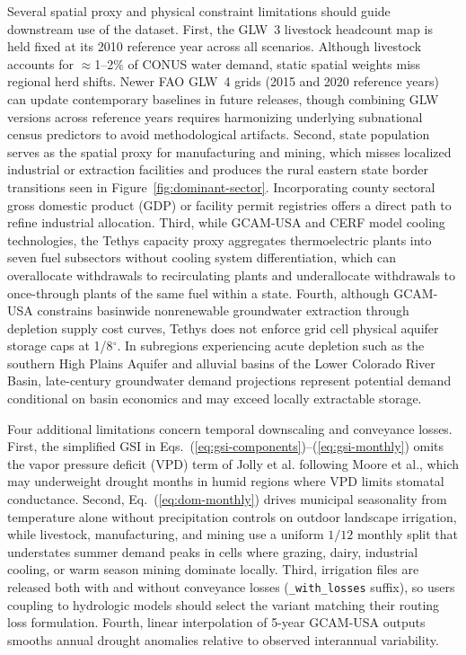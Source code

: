 \documentclass[fleqn,10pt]{wlscirep}
\begin{document}
Several spatial proxy and physical constraint limitations should guide downstream use of the dataset. First, the GLW~3 livestock headcount map\cite{Gilbert2018} is held fixed at its 2010 reference year across all scenarios. Although livestock accounts for $\approx$1--2\% of CONUS water demand, static spatial weights miss regional herd shifts. Newer FAO GLW~4 grids (2015 and 2020 reference years) can update contemporary baselines in future releases, though combining GLW versions across reference years requires harmonizing underlying subnational census predictors to avoid methodological artifacts. Second, state population serves as the spatial proxy for manufacturing and mining, which misses localized industrial or extraction facilities and produces the rural eastern state border transitions seen in Figure~\ref{fig:dominant-sector}. Incorporating county sectoral gross domestic product (GDP) or facility permit registries offers a direct path to refine industrial allocation. Third, while GCAM-USA and CERF model cooling technologies, the Tethys capacity proxy aggregates thermoelectric plants into seven fuel subsectors without cooling system differentiation, which can overallocate withdrawals to recirculating plants and underallocate withdrawals to once-through plants of the same fuel within a state\cite{Peer2016ERL,Sjostedt2025EST}. Fourth, although GCAM-USA constrains basinwide nonrenewable groundwater extraction through depletion supply cost curves\cite{Binsted_2022,Niazi2024PeakWater}, Tethys does not enforce grid cell physical aquifer storage caps at 1/8$^{\circ}$. In subregions experiencing acute depletion such as the southern High Plains Aquifer\cite{Steward2016AWM} and alluvial basins of the Lower Colorado River Basin\cite{Abdelmohsen2025GRL}, late-century groundwater demand projections represent potential demand conditional on basin economics and may exceed locally extractable storage.

Four additional limitations concern temporal downscaling and conveyance losses. First, the simplified GSI in Eqs.~(\ref{eq:gsi-components})--(\ref{eq:gsi-monthly}) omits the vapor pressure deficit (VPD) term of Jolly et al.\cite{Jolly_2005} following Moore et al.\cite{Moore_2015}, which may underweight drought months in humid regions where VPD limits stomatal conductance. Second, Eq.~(\ref{eq:dom-monthly}) drives municipal seasonality from temperature alone\cite{Wada2011} without precipitation controls on outdoor landscape irrigation\cite{Luukkonen2023USGS,Luukkonen2025JAWRA}, while livestock, manufacturing, and mining use a uniform $1/12$ monthly split that understates summer demand peaks in cells where grazing, dairy, industrial cooling, or warm season mining dominate locally\cite{Hou2024ESSD,Grogan2022GMD,LeRiche2017Water}. Third, irrigation files are released both with and without conveyance losses (\texttt{\_with\_losses} suffix), so users coupling to hydrologic models should select the variant matching their routing loss formulation. Fourth, linear interpolation of 5-year GCAM-USA outputs smooths annual drought anomalies relative to observed interannual variability.
\end{document}
